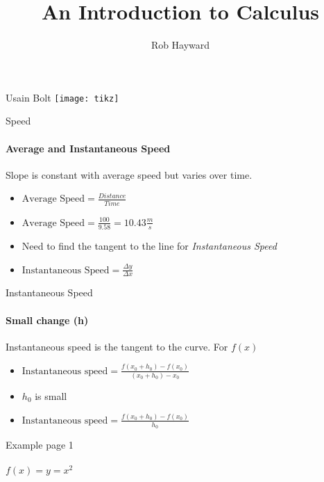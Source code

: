 \documentclass[14pt,xcolor=pdftex,dvipsnames,table]{beamer}
\title{An Introduction to Calculus}
\author{Rob Hayward}
\date{}
\begin{document}
\begin{frame}
\titlepage
\end{frame}


\begin{frame}{Usain Bolt}
\texttt{[image: tikz]}
\end{frame}

\begin{frame}{Speed}
\framesubtitle{Average and Instantaneous Speed}
Slope is constant with average speed but varies over time.
\pause
\begin{itemize}[<+-| alert@+>]
\item $\text{Average Speed} = \frac{Distance}{Time}$
\item $\text{Average Speed} = \frac{100}{9.58} = 10.43\frac{m}{s}$
\item Need to find the tangent to the line for \emph{Instantaneous Speed}
\item $\text{Instantaneous Speed} = \frac{\Delta y}{\Delta x}$
\end{itemize}
\end{frame}

\begin{frame}{Instantaneous Speed}
\framesubtitle{Small change (h)}
Instantaneous speed is the tangent to the curve.  For $f(x)$
\pause
\begin{itemize}[<+-| alert@+>]
\item $\text{Instantaneous speed} = \frac{f(x_0 + h_0) - f(x_0)}{(x_0 +h_0) - 
x_0}$ 
\item $h_0$ is small
\item $\text{Instantaneous speed} = \frac{f(x_0 + h_0) - f(x_0)}{h_0}$
\end{itemize}
\end{frame}

\begin{frame}{Example page 1}
\framesubtitle{$f(x) = y = x^2$}
\end{frame}
\end{document}
